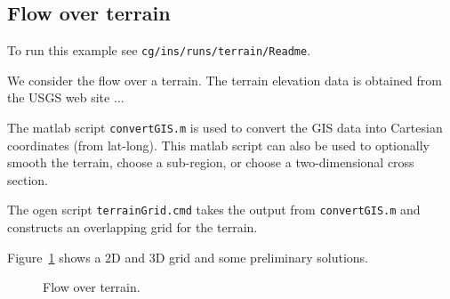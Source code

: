 \newcommand{\Gt}{\Gc_{t}}
\subsection{Flow over terrain}\label{sec:terrain}


To run this example see {\tt cg/ins/runs/terrain/Readme}.


We consider the flow over a terrain. The terrain elevation data is 
obtained from the USGS web site ...

The matlab script {\tt convertGIS.m} is used to convert the GIS data
into Cartesian coordinates (from lat-long). This matlab script
can also be used to optionally smooth the terrain, choose a sub-region,
or choose a two-dimensional cross section. 

The ogen script {\tt terrainGrid.cmd} takes the output from {\tt convertGIS.m}
and constructs an overlapping grid for the terrain.

Figure~\ref{fig:terrainGridAndFlow} shows a 2D and 3D grid and some preliminary
solutions.




{%
\newcommand{\figWidthc}{8.0cm}
\newcommand{\trimfigc}[2]{\trimPlotb{#1}{#2}{.0}{.0}{.2}{.2}}
\newcommand{\figWidtha}{7.5cm}
\newcommand{\trimfiga}[2]{\trimPlotb{#1}{#2}{.0}{.0}{.25}{.1}}
% 
\newcommand{\figWidthb}{7.5cm}
\newcommand{\trimfigb}[2]{\trimPlotb{#1}{#2}{.0}{.0}{.05}{.1}}
% 
\begin{figure}[hbt]
\begin{center}
\end{center}
 \caption{Flow over terrain.}
  \label{fig:terrainGridAndFlow}
\end{figure}
%
}%


